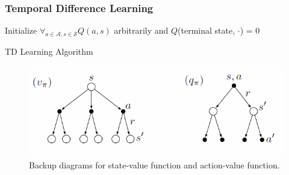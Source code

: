 \documentclass{beamer}
\newcommand{\actionspace}{\mathcal{A}}
\newcommand{\statespace}{\mathcal{S}}
\begin{document}
    \begin{frame}
        \frametitle{Temporal Difference Learning}

        \begin{algorithm}[H]

            Initialize $\forall_{a \in \actionspace, s \in \statespace} Q(a, s)$ arbitrarily and $Q$(terminal state, $\cdot$) = 0


            \caption{TD Learning Algorithm}
            \label{alg:td_learning}
        \end{algorithm}
    \end{frame}

    \begin{frame}
        \begin{figure}[ht]
            \centering
            \includegraphics[width=\linewidth]{./images/backup_diagrams.PNG}
            \caption{Backup diagrams for state-value function and action-value function.}
            \label{fig:backup_diagrams}
        \end{figure}
    \end{frame}
\end{document}
